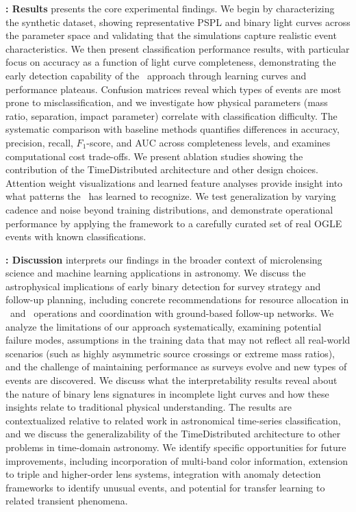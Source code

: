 \textbf{: Results} presents the core experimental findings. We begin by characterizing the synthetic dataset, showing representative PSPL and binary light curves across the parameter space and validating that the simulations capture realistic event characteristics. We then present classification performance results, with particular focus on accuracy as a function of light curve completeness, demonstrating the early detection capability of the \cnn\ approach through learning curves and performance plateaus. Confusion matrices reveal which types of events are most prone to misclassification, and we investigate how physical parameters (mass ratio, separation, impact parameter) correlate with classification difficulty. The systematic comparison with baseline methods quantifies differences in accuracy, precision, recall, $F_1$-score, and AUC across completeness levels, and examines computational cost trade-offs. We present ablation studies showing the contribution of the TimeDistributed architecture and other design choices. Attention weight visualizations and learned feature analyses provide insight into what patterns the \cnn\ has learned to recognize. We test generalization by varying cadence and noise beyond training distributions, and demonstrate operational performance by applying the framework to a carefully curated set of real OGLE events with known classifications.

\textbf{: Discussion} interprets our findings in the broader context of microlensing science and machine learning applications in astronomy. We discuss the astrophysical implications of early binary detection for survey strategy and follow-up planning, including concrete recommendations for resource allocation in \lsst\ and \romantel\ operations and coordination with ground-based follow-up networks. We analyze the limitations of our approach systematically, examining potential failure modes, assumptions in the training data that may not reflect all real-world scenarios (such as highly asymmetric source crossings or extreme mass ratios), and the challenge of maintaining performance as surveys evolve and new types of events are discovered. We discuss what the interpretability results reveal about the nature of binary lens signatures in incomplete light curves and how these insights relate to traditional physical understanding. The results are contextualized relative to related work in astronomical time-series classification, and we discuss the generalizability of the TimeDistributed architecture to other problems in time-domain astronomy. We identify specific opportunities for future improvements, including incorporation of multi-band color information, extension to triple and higher-order lens systems, integration with anomaly detection frameworks to identify unusual events, and potential for transfer learning to related transient phenomena.

